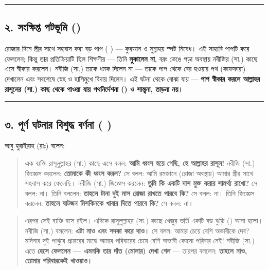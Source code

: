 \medskip\hrule\medskip

\subsection*{২. সংক্ষিপ্ত পটভূমি ()}

রোজার দিনে স্ত্রীর সাথে সহবাস করা বড় পাপ ( ) — কুরআন ও সুন্নাহয় স্পষ্ট নিষেধ। এই সাহাবি পাপটি করে ফেললেন; কিন্তু তার প্রতিক্রিয়াটি ছিল শিক্ষণীয় — তিনি \textbf{লুকালেন না}, বরং ভেঙে পড়া অবস্থায় নবীজির (সা.) কাছে এসে স্বীকার করলেন। নবীজি (সা.) তাকে ধমক দিলেন না — তাকে পাপ থেকে বের হওয়ার পথ (কাফফারা) দেখালেন এবং সবশেষে স্নেহ ও হাসিমুখে বিদায় দিলেন। এই ঘটনা থেকে বোঝা যায় — \textbf{পাপ স্বীকার করলে আল্লাহর রাসূলের (সা.) কাছ থেকে পাওয়া যায় পথনির্দেশনা () ও সান্ত্বনা, তাড়না নয়।}

\medskip\hrule\medskip

\subsection*{৩. পূর্ণ ঘটনার বিশুদ্ধ বর্ণনা (  )}

আবু হুরাইরাহ (রাঃ) বলেন:

\begin{quote}
এক ব্যক্তি রাসূলুল্লাহর (সা.) কাছে এসে বলল: \textbf{আমি ধ্বংস হয়ে গেছি, হে আল্লাহর রাসূল!} নবীজি (সা.) জিজ্ঞেস করলেন: \textbf{তোমাকে কী ধ্বংস করল?} সে বলল: আমি রমজানে (রোজা অবস্থায়) আমার স্ত্রীর সাথে সহবাস করে ফেলেছি। নবীজি (সা.) জিজ্ঞেস করলেন: \textbf{তুমি কি একটি দাস মুক্ত করার সামর্থ্য রাখো?} সে বলল: না। তিনি বললেন: \textbf{তাহলে টানা দুই মাস রোজা রাখতে পারবে কি?} সে বলল: না। তিনি জিজ্ঞেস করলেন: \textbf{তাহলে ষাটজন মিসকিনকে খাবার দিতে পারবে কি?} সে বলল: না।
\end{quote}

\begin{quote}
এরপর সেই ব্যক্তি বসে রইল। এদিকে রাসূলুল্লাহর (সা.) কাছে খেজুর ভর্তি একটি বড় ঝুড়ি () আনা হলো। নবীজি (সা.) বললেন: \textbf{এটা নাও এবং সদকা করে দাও।} সে বলল: আমার চেয়ে বেশি অভাবীকে দেব? মদিনার দুই পাথুরে প্রান্তরের মাঝে আমার পরিবারের চেয়ে বেশি অভাবী কোনো পরিবার নেই! নবীজি (সা.) এতে \textbf{হেসে ফেললেন — এমনকি তার দাঁত (মোলার) দেখা গেল} — তারপর বললেন: \textbf{তাহলে নাও, তোমার পরিবারকেই খাওয়াও।}
\end{quote}

